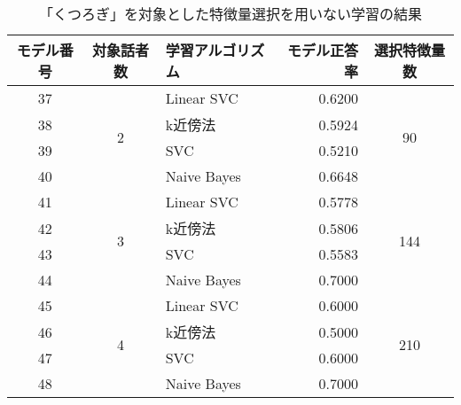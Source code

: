 \begin{table}[tpb]
    \caption{「くつろぎ」を対象とした特徴量選択を用いない学習の結果}
    \centering
    \begin{tabular}{|c|c|l|r|c|}
        \hline
        モデル番号 & 対象話者数 & 学習アルゴリズム & モデル正答率 & 選択特徴量数 \\\hline\hline
        37 & \multirow{4}{*}{2} & Linear SVC & 0.6200 & \multirow{4}{*}{90} \\ \cline{1-1}\cline{3-4}
        38 & & k近傍法 & 0.5924 & \\ \cline{1-1}\cline{3-4}
        39 & & SVC & 0.5210 & \\ \cline{1-1}\cline{3-4}
        40 & & Naive Bayes & 0.6648 & \\ \hline
        41 & \multirow{4}{*}{3} & Linear SVC & 0.5778 & \multirow{4}{*}{144} \\ \cline{1-1}\cline{3-4}
        42 & & k近傍法 & 0.5806 & \\ \cline{1-1}\cline{3-4}
        43 & & SVC & 0.5583 & \\ \cline{1-1}\cline{3-4}
        44 & & Naive Bayes & 0.7000 & \\ \hline
        45 & \multirow{4}{*}{4} & Linear SVC & 0.6000 & \multirow{4}{*}{210} \\ \cline{1-1}\cline{3-4}
        46 & & k近傍法 & 0.5000 & \\ \cline{1-1}\cline{3-4}
        47 & & SVC & 0.6000 & \\ \cline{1-1}\cline{3-4}
        48 & & Naive Bayes & 0.7000 & \\ \hline
    \end{tabular}
    \label{tab:comfortable_learning_result_without_FS}
\end{table}
